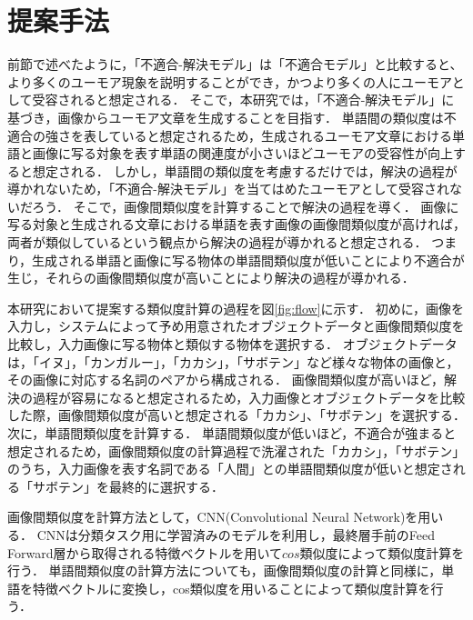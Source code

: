 \documentclass[twocolumn,2pt]{jarticle}
\begin{document}
\section{提案手法}
前節で述べたように，「不適合-解決モデル」は「不適合モデル」と比較すると、より多くのユーモア現象を説明することができ，かつより多くの人にユーモアとして受容されると想定される．
そこで，本研究では，「不適合-解決モデル」に基づき，画像からユーモア文章を生成することを目指す．
単語間の類似度は不適合の強さを表していると想定されるため\cite{kao}，生成されるユーモア文章における単語と画像に写る対象を表す単語の関連度が小さいほどユーモアの受容性が向上すると想定される．
しかし，単語間の類似度を考慮するだけでは，解決の過程が導かれないため，「不適合-解決モデル」を当てはめたユーモアとして受容されないだろう．
そこで，画像間類似度を計算することで解決の過程を導く．
画像に写る対象と生成される文章における単語を表す画像の画像間類似度が高ければ，両者が類似しているという観点から解決の過程が導かれると想定される．
つまり，生成される単語と画像に写る物体の単語間類似度が低いことにより不適合が生じ，それらの画像間類似度が高いことにより解決の過程が導かれる．



本研究において提案する類似度計算の過程を図\ref{fig:flow}に示す．
初めに，画像を入力し，システムによって予め用意されたオブジェクトデータと画像間類似度を比較し，入力画像に写る物体と類似する物体を選択する．
オブジェクトデータは，「イヌ」，「カンガルー」，「カカシ」，「サボテン」など様々な物体の画像と，その画像に対応する名詞のペアから構成される．
画像間類似度が高いほど，解決の過程が容易になると想定されるため，入力画像とオブジェクトデータを比較した際，画像間類似度が高いと想定される「カカシ」、「サボテン」を選択する．
次に，単語間類似度を計算する．
単語間類似度が低いほど，不適合が強まると想定されるため，画像間類似度の計算過程で洗濯された「カカシ」，「サボテン」のうち，入力画像を表す名詞である「人間」との単語間類似度が低いと想定される「サボテン」を最終的に選択する．



画像間類似度を計算方法として，CNN(Convolutional Neural Network)を用いる．
CNNは分類タスク用に学習済みのモデルを利用し，最終層手前のFeed Forward層から取得される特徴ベクトルを用いて$cos$類似度によって類似度計算を行う．
単語間類似度の計算方法についても，画像間類似度の計算と同様に，単語を特徴ベクトルに変換し，cos類似度を用いることによって類似度計算を行う．


\end{document}
